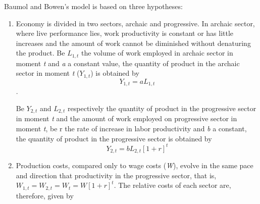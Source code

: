 \documentclass[a4paper, 12pt, openright, oneside, german, french, brazil, english]{abntex2}
\begin{document}
		
		Baumol and Bowen's model is based on three hypotheses:
	
	\begin{enumerate}
		
		\item Economy is divided in two sectors, archaic and progressive. In archaic sector, where live performance lies, work productivity is constant or has little increases and the amount of work cannot be diminished without denaturing the product. Be $L_{1,t}$ the volume of work employed in archaic sector in moment \textit{t} and \textit{a} a constant value, the quantity of product in the archaic sector in moment \textit{t} ($Y_{1,t}$) is obtained by $$Y_{1,t} = aL_{1,t}$$.
		
		
		Be $Y_{2,t}$ and $L_{2,t}$ respectively the quantity of product in the progressive sector in moment \textit{t} and the amount of work employed on progressive sector in moment \textit{t}, be r the rate of increase in labor productivity and \textit{b} a constant, the quantity of product in the progressive sector is obtained by $$Y_{2,t} = bL_{2,t}[1+r]^t $$
		
		
		\item Production costs, compared only to wage costs (\textit{W}), evolve in the same pace and direction that productivity in the progressive sector, that is, $W_{1,t} = W_{2,t} = W_t = W[1+r]^t$. The relative costs of each sector are, therefore, given by
		

\end{enumerate}
\end{document}
